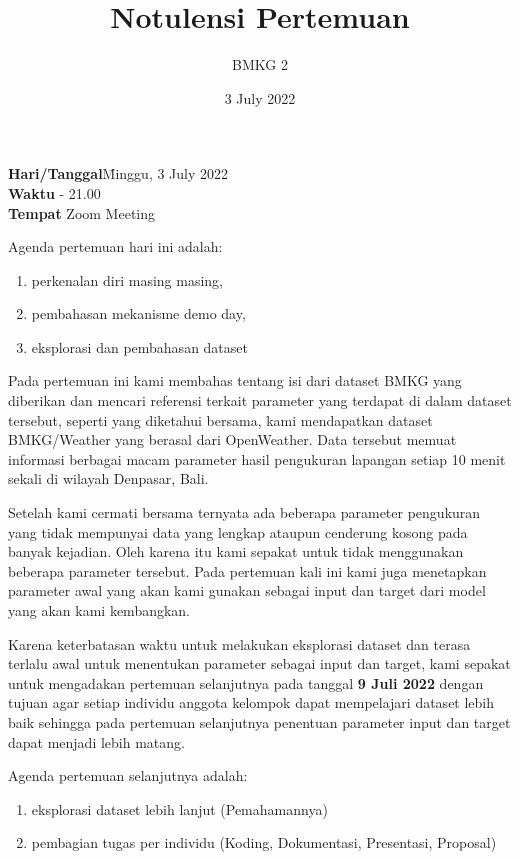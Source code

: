 \documentclass[12pt, a4paper]{article}
\title{Notulensi Pertemuan}
\author{BMKG 2}
\date{3 July 2022}
\begin{document}
\maketitle

\begin{tabbing}
\textbf{Hari/Tanggal}\quad\= Minggu, 3 July 2022 \\
\textbf{Waktu}  - 21.00 \\
\textbf{Tempat}\> Zoom Meeting
\end{tabbing}

Agenda pertemuan hari ini adalah:
\begin{enumerate}
\item perkenalan diri masing masing,
\item pembahasan mekanisme demo day,
\item eksplorasi dan pembahasan dataset
\end{enumerate}

\bigskip 
Pada pertemuan ini kami membahas tentang isi dari dataset BMKG yang diberikan dan mencari referensi terkait parameter yang terdapat di dalam dataset tersebut, seperti yang diketahui bersama, kami mendapatkan dataset BMKG/Weather yang berasal dari OpenWeather. Data tersebut memuat informasi berbagai macam parameter hasil pengukuran lapangan setiap 10 menit sekali di wilayah Denpasar, Bali.


\medskip 
Setelah kami cermati bersama ternyata ada beberapa parameter pengukuran yang tidak mempunyai data yang lengkap ataupun cenderung kosong pada banyak kejadian. Oleh karena itu kami sepakat untuk tidak menggunakan beberapa parameter tersebut. Pada pertemuan kali ini kami juga menetapkan parameter awal yang akan kami gunakan sebagai input dan target dari model yang akan kami kembangkan. 

\medskip 
Karena keterbatasan waktu untuk melakukan eksplorasi dataset dan terasa terlalu awal untuk menentukan parameter sebagai input dan target, kami sepakat untuk mengadakan pertemuan selanjutnya pada tanggal \textbf{9 Juli 2022} dengan tujuan agar setiap individu anggota kelompok dapat mempelajari dataset lebih baik sehingga pada pertemuan selanjutnya penentuan parameter input dan target dapat menjadi lebih matang.

\pagebreak
Agenda pertemuan selanjutnya adalah:
\begin{enumerate}
\item eksplorasi dataset lebih lanjut (Pemahamannya)
\item pembagian tugas per individu (Koding, Dokumentasi, Presentasi, Proposal)
\end{enumerate}
\end{document}
